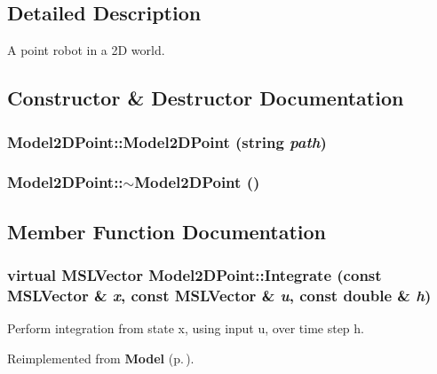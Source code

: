 \subsection{Detailed Description}
A point robot in a 2D world.



\subsection{Constructor \& Destructor Documentation}
\subsubsection{\setlength{\rightskip}{0pt plus 5cm}Model2DPoint::Model2DPoint (string {\em path})}\label{class_Model2DPoint_a0}


\subsubsection{\setlength{\rightskip}{0pt plus 5cm}Model2DPoint::$\sim$Model2DPoint ()\hspace{0.3cm}{\tt  [inline, virtual]}}\label{class_Model2DPoint_a1}




\subsection{Member Function Documentation}
\subsubsection{\setlength{\rightskip}{0pt plus 5cm}virtual {\bf MSLVector} Model2DPoint::Integrate (const {\bf MSLVector} \& {\em x}, const {\bf MSLVector} \& {\em u}, const double \& {\em h})\hspace{0.3cm}{\tt  [virtual]}}\label{class_Model2DPoint_a2}


Perform integration from state x, using input u, over time step h.



Reimplemented from {\bf Model} {\rm (p.\,\pageref{class_Model_a5})}.

